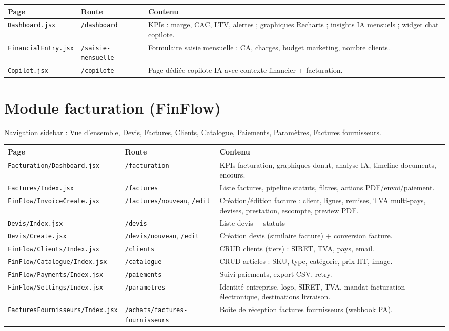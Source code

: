 \documentclass[11pt,a4paper]{report}
\newcommand{\filepath}[1]{\texttt{\small #1}}
\begin{document}
\begin{longtable}{@{}p{3.5cm}p{3cm}p{7.8cm}@{}}
\toprule
\textbf{Page} & \textbf{Route} & \textbf{Contenu} \\
\midrule
\endhead
\filepath{Dashboard.jsx} & \texttt{/dashboard} &
KPIs : marge, CAC, LTV, alertes ; graphiques Recharts ; insights IA mensuels ; widget chat copilote. \\
\filepath{FinancialEntry.jsx} & \texttt{/saisie-mensuelle} &
Formulaire saisie mensuelle : CA, charges, budget marketing, nombre clients. \\
\filepath{Copilot.jsx} & \texttt{/copilote} &
Page dédiée copilote IA avec contexte financier + facturation. \\
\bottomrule
\end{longtable}

\section{Module facturation (FinFlow)}

Navigation sidebar : Vue d'ensemble, Devis, Factures, Clients, Catalogue, Paiements, Paramètres, Factures fournisseurs.

\begin{longtable}{@{}p{4cm}p{2.8cm}p{7.5cm}@{}}
\toprule
\textbf{Page} & \textbf{Route} & \textbf{Contenu} \\
\midrule
\endhead
\filepath{Facturation/Dashboard.jsx} & \texttt{/facturation} &
KPIs facturation, graphiques donut, analyse IA, timeline documents, encours. \\
\filepath{Factures/Index.jsx} & \texttt{/factures} &
Liste factures, pipeline statuts, filtres, actions PDF/envoi/paiement. \\
\filepath{FinFlow/InvoiceCreate.jsx} & \texttt{/factures/nouveau}, \texttt{/edit} &
Création/édition facture : client, lignes, remises, TVA multi-pays, devises, prestation, escompte, preview PDF. \\
\filepath{Devis/Index.jsx} & \texttt{/devis} & Liste devis + statuts \\
\filepath{Devis/Create.jsx} & \texttt{/devis/nouveau}, \texttt{/edit} &
Création devis (similaire facture) + conversion facture. \\
\filepath{FinFlow/Clients/Index.jsx} & \texttt{/clients} &
CRUD clients (tiers) : SIRET, TVA, pays, email. \\
\filepath{FinFlow/Catalogue/Index.jsx} & \texttt{/catalogue} &
CRUD articles : SKU, type, catégorie, prix HT, image. \\
\filepath{FinFlow/Payments/Index.jsx} & \texttt{/paiements} &
Suivi paiements, export CSV, retry. \\
\filepath{FinFlow/Settings/Index.jsx} & \texttt{/parametres} &
Identité entreprise, logo, SIRET, TVA, mandat facturation électronique, destinations livraison. \\
\filepath{FacturesFournisseurs/Index.jsx} & \texttt{/achats/factures-fournisseurs} &
Boîte de réception factures fournisseurs (webhook PA). \\
\bottomrule
\end{longtable}
\end{document}
